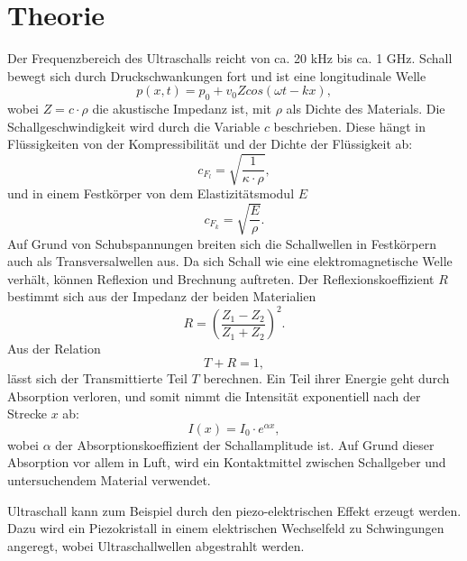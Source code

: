 

\section{Theorie}
\label{sec:Theorie}

Der Frequenzbereich des Ultraschalls reicht von ca. 20 \si{\kilo\hertz} bis ca. 1 \si{\giga\hertz}.
Schall bewegt sich durch Druckschwankungen fort und ist eine longitudinale Welle
\begin{equation}
p(x,t) = p_0 + v_0 Z cos(\omega t - kx) ,
\end{equation}
wobei $Z = c \cdot \rho $ die akustische Impedanz ist, mit $\rho$ als Dichte des Materials.
Die Schallgeschwindigkeit wird durch die Variable $c$ beschrieben.
Diese hängt in Flüssigkeiten von der Kompressibilität \kappa und der Dichte \rho der Flüssigkeit ab:
\begin{equation}
c_{F_l} = \sqrt{\frac{1}{\kappa \cdot \rho}} ,
\end{equation}
und in einem Festkörper von dem Elastizitätsmodul $E$
\begin{equation}
c_{F_k} = \sqrt{\frac{E}{\rho}} .
\end{equation}
Auf Grund von Schubspannungen breiten sich die Schallwellen in Festkörpern auch als Transversalwellen aus.
Da sich Schall wie eine elektromagnetische Welle verhält, können Reflexion und Brechnung auftreten.
Der Reflexionskoeffizient $R$ bestimmt sich aus der Impedanz der beiden Materialien
\begin{equation}
R = (\frac{Z_1 - Z_2}{Z_1 + Z_2})^2 .
\end{equation}
Aus der Relation
\begin{equation}
T + R = 1 ,
\end{equation}
lässt sich der Transmittierte Teil $T$ berechnen.
Ein Teil ihrer Energie geht durch Absorption verloren, und somit nimmt die Intensität exponentiell nach der Strecke $x$ ab:
\begin{equation}
I(x) = I_0 \cdot e^{\alpha x} ,
\end{equation}
wobei $\alpha$ der Absorptionskoeffizient der Schallamplitude ist. Auf Grund dieser Absorption vor allem in Luft, wird ein Kontaktmittel zwischen Schallgeber und untersuchendem Material verwendet.

\noindent Ultraschall kann zum Beispiel durch den piezo-elektrischen Effekt erzeugt werden. 
Dazu wird ein Piezokristall in einem elektrischen Wechselfeld zu Schwingungen angeregt, wobei Ultraschallwellen abgestrahlt werden.

